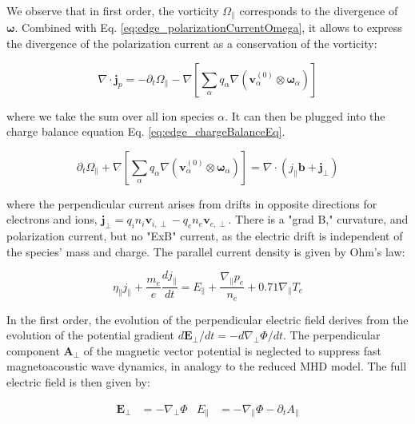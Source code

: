 We observe that in first order, the vorticity $\Omega_\parallel$ corresponds to the divergence of $\boldsymbol{\omega}$. Combined with Eq. \ref{eq:edge_polarizationCurrentOmega}, it allows to express the divergence of the polarization current as a conservation of the vorticity:

\begin{equation}
	\label{eq:edge_vorticityConservation}
	\nabla \cdot \mathbf{j}_p = -\partial_t\Omega_\parallel - \nabla \left[\sum_\alpha q_\alpha \nabla\left(\mathbf{v}^{(0)}_\alpha\otimes\boldsymbol{\omega}_\alpha\right)\right]
\end{equation}

where we take the sum over all ion species $\alpha$. It can then be plugged into the charge balance equation Eq. \ref{eq:edge_chargeBalanceEq}.

\begin{equation}
	\label{eq:edge_vorticityEquation}
	\partial_t\Omega_\parallel + \nabla \left[\sum_\alpha q_\alpha \nabla\left(\mathbf{v}^{(0)}_\alpha\otimes\boldsymbol{\omega}_\alpha\right)\right] = \nabla \cdot \left(j_\parallel\mathbf{b} + \mathbf{j}_\perp\right)
\end{equation}

where the perpendicular current arises from drifts in opposite directions for electrons and ions, $\mathbf{j}_\perp = q_i n_i \mathbf{v}_{i,\perp} - q_e n_e \mathbf{v}_{e,\perp}$. There is a "grad B," curvature, and polarization current, but no "ExB" current, as the electric drift is independent of the species' mass and charge. The parallel current density is given by Ohm's law:

\begin{equation}
	\eta_\parallel j_\parallel + \frac{m_e}{e}\frac{dj_\parallel}{dt} = E_\parallel + \frac{\nabla_\parallel p_e}{n_e} + 0.71\nabla_\parallel T_e
\end{equation}

In the first order, the evolution of the perpendicular electric field derives from the evolution of the potential gradient $d\mathbf{E}_\perp / dt = -d\nabla_\perp \Phi / dt$. The perpendicular component $\mathbf{A}_\perp$ of the magnetic vector potential is neglected to suppress fast magnetoacoustic wave dynamics, in analogy to the reduced MHD model. The full electric field is then given by:

\begin{align}
	\mathbf{E}_\perp &= -\nabla_\perp \Phi &
	E_\parallel &= -\nabla_\parallel \Phi - \partial_t A_\parallel
\end{align}

